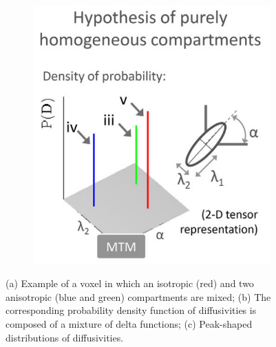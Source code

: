\begin{figure}[h]
\begin{subfigure}{.32\textwidth}
      \caption{}
      \label{fig:homogeneous_compartments_diamond}
   \end{subfigure}
   \begin{subfigure}{.32\textwidth}
      \centering
      \includegraphics[width=\textwidth]{images/diamond3.png}
      \caption{}
      \label{fig:heterogeneous_compartments_diamond}
   \end{subfigure}
   \caption{(a) Example of a voxel in which an isotropic (red) and two anisotropic (blue and green) compartments are mixed; (b) The corresponding probability density function of diffusivities is composed of a mixture of delta functions; (c) Peak-shaped distributions of diffusivities. \cite{scherrer2016diamond}}
 \end{figure}

